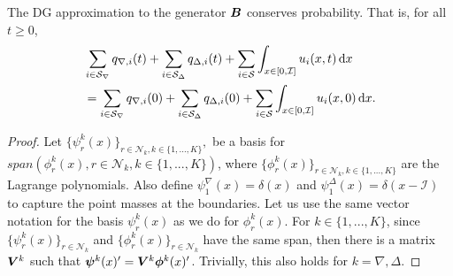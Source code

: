 \begin{cor}
	The DG approximation to the generator \(  \boldsymbol B\) conserves probability. That is, for all \(t\geq 0\), 
	\begin{align*}
	&\sum_{i\in\mathcal{S}_\nabla}q_{\nabla,i}(t)+\sum_{i\in\mathcal{S}_\Delta}q_{\Delta,i}(t)+\sum_{i\in\mathcal{S}} \int_{x\in[0,\mathcal I]}u_i(x,t)\, \mathrm{d} x 
	\\&= \sum_{i\in\mathcal{S}_\nabla}q_{\nabla,i}(0)+\sum_{i\in\mathcal{S}_\Delta}q_{\Delta,i}(0)+\sum_{i\in\mathcal{S}} \int_{x\in[0,\mathcal I]}u_i(x,0)\, \mathrm{d} x.
	\end{align*}
\end{cor}
\begin{proof}
Let \(\{\psi_r^k(x)\}_{r\in\mathcal N_k,k\in\{1,...,K\}},\) be a basis for \(span(\phi_r^k(x),r\in\mathcal N_k,k\in\{1,...,K\})\), where \(\{\phi_r^k(x)\}_{r\in\mathcal N_k,k\in\{1,...,K\}}\) are the Lagrange polynomials. Also define \(\psi_1^\nabla(x)=\delta(x)\) and \(\psi_1^\Delta(x)=\delta(x-\mathcal I)\) to capture the point masses at the boundaries. Let us use the same vector notation for the basis \(\psi_r^k(x)\) as we do for \(\phi_r^k(x)\). For \(k\in\{1,...,K\}\), since \(\{\psi_r^k(x)\}_{r\in\mathcal N_k}\) and \(\{\phi_r^k(x)\}_{r\in\mathcal N_k}\) have the same span, then there is a matrix \(\boldsymbol V^k\) such that  \(\boldsymbol \psi^k(x)'{} = \boldsymbol V^k\boldsymbol \phi^k(x)'{}\). Trivially, this also holds for \(k=\nabla,\Delta\). 


\end{proof}
